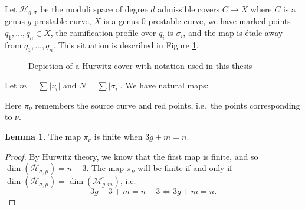 \documentclass[11pt]{article}           %
\newcommand{\Hb}{\overline{\mathcal H}}
\theoremstyle{definition}
\newtheorem{lem}{Lemma}[section]
\begin{document}
Let $\Hb_{g,\sigma}$ be the moduli space of degree $d$ admissible covers $C\to X$
where $C$ is a genus $g$ prestable curve, $X$ is a genus $0$ prestable curve, we have marked points $q_1,\dots,q_n\in X$, the ramification profile over $q_i$ is $\sigma_i$, and the map is \'etale away from $q_1,\dots,q_n$. This situation is described in Figure \ref{fig:hurwitz}.

\begin{figure}[h]
  \caption{Depiction of a Hurwitz cover with notation used in this thesis}
  \centering
{}

\label{fig:hurwitz}
\end{figure}



Let $m=\sum|\nu_i|$ and $N=\sum|\sigma_i|$.
We have natural maps:

\begin{figure}[h]
  \centering
{}
\label{fig:maps}
\end{figure}

Here $\pi_{\nu}$ remembers the source curve and red points, i.e.\ the points corresponding to $\nu$. 

\begin{lem}
  \label{lem:dim}
 The map $\pi_{\nu}$ is finite when $3g+m=n$.
\end{lem}
\begin{proof}
  By Hurwitz theory, we know that the first map is finite, and so $\dim(\Hb_{\sigma,\mu})=n-3$. The map $\pi_{\nu}$ will be finite if and only if
  $\dim(\Hb_{\sigma,\mu})=\dim(\overline{\mathcal M_{g,m}})$, i.e.
  \[
  3g-3+m=n-3\iff 3g+m=n.
  \]
  \end{proof}
\end{document}
